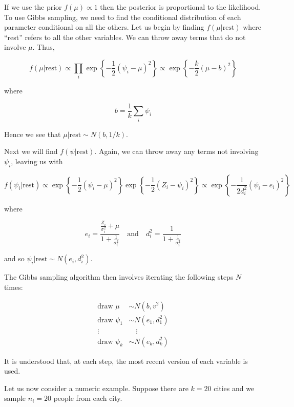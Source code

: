 If we use the prior \(f(\mu) \propto 1\) then the posterior is
proportional to the likelihood. To use Gibbs sampling, we need to find
the conditional distribution of each parameter conditional on all the
others. Let us begin by finding \(f(\mu | \text{rest})\) where ``rest''
refers to all the other variables. We can throw away terms that do not
involve \(\mu\). Thus,

\[ f(\mu | \text{rest}) \propto \prod_{i} \exp \left\{ -\frac{1}{2} (\psi_{i} - \mu)^{2} \right\} \propto \exp \left\{ -\frac{k}{2} (\mu - b)^{2} \right\} \]

where

\[ b = \frac{1}{k} \sum_{i} \psi_{i} \]

Hence we see that \(\mu | \text{rest} \sim N(b, 1 / k)\).

Next we will find \(f(\psi | \text{rest})\). Again, we can throw away
any terms not involving \(\psi_{i}\), leaving us with

\[ f(\psi_{i} | \text{rest}) \propto \exp \left\{-\frac{1}{2} (\psi_{i} - \mu)^{2} \right\} \exp \left\{ -\frac{1}{2} (Z_{i} - \psi_{i})^{2} \right\} \propto \exp \left\{ -\frac{1}{2d_{i}^{2}}(\psi_{i} - e_{i})^{2} \right\} \]

where

\[ 
e_{i} = \frac{\frac{Z_{i}}{\sigma_{i}^{2}} + \mu}{1 + \frac{1}{\sigma_{i}^{2}}}
\quad \text{and} \quad
d_{i}^{2} = \frac{1}{1 + \frac{1}{\sigma_{i}^{2}}}
\]

and so \(\psi_{i} | \text{rest} \sim N(e_{i}, d_{i}^{2})\).

The Gibbs sampling algorithm then involves iterating the following steps
\(N\) times:

\begin{align*}
\text{draw } \mu &\sim N(b, v^{2}) \\
\text{draw } \psi_{1} &\sim N(e_{1}, d_{1}^{2}) \\
\vdots & \quad \vdots \\
\text{draw } \psi_{k} &\sim N(e_{k}, d_{k}^{2})
\end{align*}

It is understood that, at each step, the most recent version of each
variable is used.

Let us now consider a numeric example. Suppose there are \(k = 20\)
cities and we sample \(n_{i} = 20\) people from each city.

